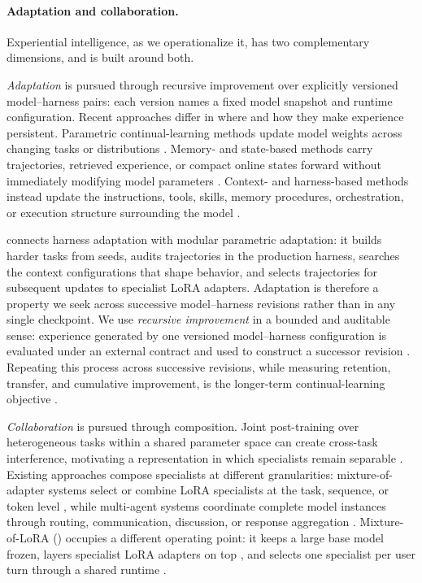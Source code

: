 \paragraph{Adaptation and collaboration.}
Experiential intelligence, as we operationalize it, has two complementary
dimensions, and \macaron{} is built around both.

\emph{Adaptation} is pursued through recursive improvement over explicitly
versioned model--harness pairs: each version names a fixed model snapshot and
runtime configuration.
Recent approaches differ in where and how they make experience persistent.
Parametric continual-learning methods update model weights across changing
tasks or distributions
\citep{continual_learning_llm_survey_2026,tic_lm_2025,
when_cl_requires_learning_2026}. Memory- and state-based methods carry
trajectories, retrieved experience, or compact online states forward without
immediately modifying model parameters
\citep{jitrl_2026,delta_mem_2026,livemem_2026,
metis_2026,exg_2026}. Context- and harness-based methods instead update the
instructions, tools, skills, memory procedures, orchestration, or execution
structure surrounding the model
\citep{ace_2026,meta_harness_2026,continual_harness_2026,
recursive_harness_2026}.

\macaron{} connects harness adaptation with modular parametric adaptation: it
builds harder tasks from seeds, audits trajectories in the production harness,
searches the context configurations that shape behavior, and selects
trajectories for subsequent updates to specialist LoRA adapters. Adaptation is
therefore a property we seek across successive model--harness revisions rather
than in any single checkpoint. We use \emph{recursive improvement} in a bounded
and auditable sense: experience generated by one versioned model--harness
configuration is evaluated under an external contract and used to construct a
successor revision
\citep{rsi_survey_2026}. Repeating this process across successive revisions,
while measuring retention, transfer, and cumulative improvement, is the
longer-term continual-learning objective
\citep{continual_learning_llm_survey_2026,
when_cl_requires_learning_2026}.

\emph{Collaboration} is pursued through composition. Joint post-training over
heterogeneous tasks within a shared parameter space can create cross-task
interference, motivating a representation in which specialists remain
separable
\citep{badit_2026}. Existing approaches compose specialists at different
granularities: mixture-of-adapter systems select or combine LoRA specialists at
the task, sequence, or token level
\citep{lorauter_2026,molora_2026}, while multi-agent systems coordinate
complete model instances through routing, communication, discussion, or
response aggregation
\citep{multiagent_collaboration_survey_2025,rethinking_moa_2025}.
Mixture-of-LoRA (\molshort{}) occupies a different operating point: it keeps a
large base model frozen, layers specialist LoRA adapters on top
\citep{lora2022,lora_without_regret_2025}, and selects one specialist per user
turn through a shared runtime
\citep{mol_harness2026}.

